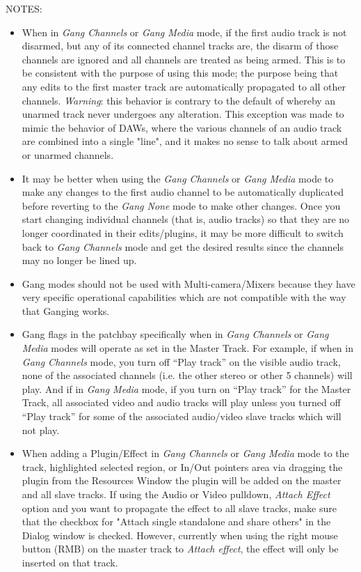 NOTES:
\begin{itemize}
	\item When in \textit{Gang Channels} or \textit{Gang Media} mode, if the first audio track is not disarmed, but 	any of its connected channel tracks are, the disarm of those channels are ignored and all channels are treated as being armed. This is to be consistent with the purpose of using this mode; the purpose being that any edits to the first master track are automatically propagated to all other channels. \textit{Warning}: this behavior is contrary to the default of \CGG{} whereby an unarmed track never undergoes any alteration. This exception was made to mimic the behavior of DAWs, where the various channels of an audio track are combined into a single "line", and it makes no sense to talk about armed or unarmed channels.
	\item It may be better when using the \textit{Gang Channels} or \textit{Gang Media} mode to make any changes
	to the first audio channel to be automatically duplicated before reverting to the \textit{Gang None} mode to make other changes. Once you start changing individual channels (that is, audio tracks) so that they are no longer coordinated in their edits/plugins, it may be more difficult to switch back to \textit{Gang Channels} mode and get the desired results since the channels may no longer be lined up.
	\item Gang modes should not be used with Multi-camera/Mixers because they have very specific operational capabilities which are not compatible with the way that Ganging works.
	\item Gang flags in the patchbay specifically when in \textit{Gang Channels} or \textit{Gang Media} modes will operate as set in the Master Track. For example, if when in \textit{Gang Channels} mode, you turn off “Play track” on the visible audio track, none of the associated channels (i.e. the other stereo or other 5 channels) will play. And if in \textit{Gang Media} mode, if you turn on “Play track” for the Master Track, all associated video and audio tracks will play unless you turned off “Play track” for some of the associated audio/video slave tracks which will not play. 
	\item When adding a Plugin/Effect in \textit{Gang Channels} or \textit{Gang Media} mode to the track, highlighted selected region, or In/Out pointers area via dragging the plugin from the Resources Window the plugin will be added on the master and all slave tracks.  If using the Audio or Video pulldown, \textit{Attach Effect} option and you want to propagate the effect to all slave tracks, make sure that the checkbox for "Attach single standalone and share others" in the Dialog window is checked.  However, currently when using the right mouse button (RMB) on the master track to \textit{Attach effect}, the effect will only be inserted on that track.
\end{itemize}

